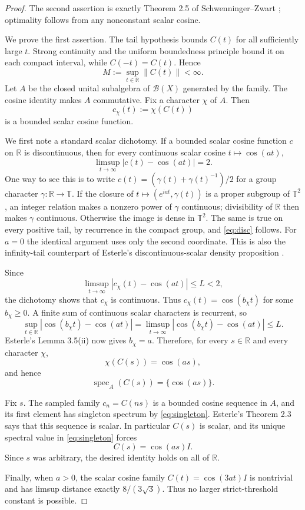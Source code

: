 \documentclass[11pt]{article}
\newcommand{\R}{\mathbb R}
\newcommand{\T}{\mathbb T}
\newcommand{\B}{\mathcal B}
\newcommand{\spec}{\operatorname{spec}}
\begin{document}
\begin{proof}
The second assertion is exactly Theorem 2.5 of Schwenninger--Zwart
\cite{SZ15}; optimality follows from any nonconstant scalar cosine.

We prove the first assertion.  The tail hypothesis bounds $C(t)$ for all
sufficiently large $t$.  Strong continuity and the uniform boundedness
principle bound it on each compact interval, while $C(-t)=C(t)$.  Hence
\[
 M:=\sup_{t\in\R}\|C(t)\|<\infty.
\]
Let $A$ be the closed unital subalgebra of $\B(X)$ generated by the family.
The cosine identity makes $A$ commutative.  Fix a character $\chi$ of $A$.
Then
\[
 c_\chi(t):=\chi(C(t))
\]
is a bounded scalar cosine function.

We first note a standard scalar dichotomy.  If a bounded scalar cosine
function $c$ on $\R$ is discontinuous, then for every continuous scalar
cosine $t\mapsto\cos(at)$,
\begin{equation}\label{eq:disc}
 \limsup_{t\to\infty}|c(t)-\cos(at)|=2.
\end{equation}
One way to see this is to write
$c(t)=(\gamma(t)+\gamma(t)^{-1})/2$ for a group character
$\gamma:\R\to\T$.  If the closure of
$t\mapsto(e^{iat},\gamma(t))$ is a proper subgroup of $\T^2$, an integer
relation makes a nonzero power of $\gamma$ continuous; divisibility of
$\R$ then makes $\gamma$ continuous.  Otherwise the image is dense in
$\T^2$.  The same is true on every positive tail, by recurrence in the
compact group, and \eqref{eq:disc} follows.  For $a=0$ the identical
argument uses only the second coordinate.  This is also the
infinity-tail counterpart of Esterle's discontinuous-scalar density
proposition \cite[Proposition 3.1]{E15}.

Since
\[
 \limsup_{t\to\infty}|c_\chi(t)-\cos(at)|
 \leq L<2,
\]
the dichotomy shows that $c_\chi$ is continuous.  Thus
$c_\chi(t)=\cos(b_\chi t)$ for some $b_\chi\geq0$.  A finite sum of
continuous scalar characters is recurrent, so
\[
 \sup_{t\in\R}|\cos(b_\chi t)-\cos(at)|
 =\limsup_{t\to\infty}|\cos(b_\chi t)-\cos(at)|
 \leq L.
\]
Esterle's Lemma 3.5(ii) now gives $b_\chi=a$.  Therefore, for every
$s\in\R$ and every character $\chi$,
\[
 \chi(C(s))=\cos(as),
\]
and hence
\begin{equation}\label{eq:singleton}
 \spec_A(C(s))=\{\cos(as)\}.
\end{equation}

Fix $s$.  The sampled family $c_n=C(ns)$ is a bounded cosine sequence in
$A$, and its first element has singleton spectrum by
\eqref{eq:singleton}.  Esterle's Theorem 2.3 says that this sequence is
scalar.  In particular $C(s)$ is scalar, and its unique spectral value in
\eqref{eq:singleton} forces
\[
 C(s)=\cos(as)I.
\]
Since $s$ was arbitrary, the desired identity holds on all of $\R$.

Finally, when $a>0$, the scalar cosine family
$C(t)=\cos(3at)I$ is nontrivial and has limsup distance exactly
$8/(3\sqrt3)$.  Thus no larger strict-threshold constant is possible.
\end{proof}
\end{document}
